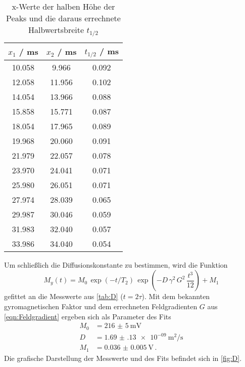 \begin{table}
  \centering
  \caption{x-Werte der halben Höhe der Peaks und die daraus errechnete
  Halbwertsbreite $t_{1/2}$}
  \label{tab:halbwertsbreite}
  \begin{tabular}{c c c}
    \toprule
    $x_1$ / \si{\ms} & $x_2$ / \si{\ms} & $t_{1/2}$ / \si{\ms} \\
    \midrule
    10.058 & 9.966 & 0.092 \\
    12.058 & 11.956 & 0.102 \\
    14.054 & 13.966 & 0.088 \\
    15.858 & 15.771 & 0.087 \\
    18.054 & 17.965 & 0.089 \\
    19.968 & 20.060 & 0.091 \\
    21.979 & 22.057 & 0.078 \\
    23.970 & 24.041 & 0.071 \\
    25.980 & 26.051 & 0.071 \\
    27.974 & 28.039 & 0.065 \\
    29.987 & 30.046 & 0.059 \\
    31.983 & 32.040 & 0.057 \\
    33.986 & 34.040 & 0.054 \\
    \bottomrule
  \end{tabular}
\end{table}

Um schließlich die Diffusionskonstante zu bestimmen, wird die Funktion
\begin{equation}
  M_y(t) = M_0 \, \exp(-t/T_2) \, \exp(-D \, \gamma^2 \, G^2 \, \frac{t^3}{12})
  + M_1
  \label{eqn:Diffusionskonstante}
\end{equation}
gefittet an die Messwerte aus \autoref{tab:D} ($t = 2\tau$). Mit dem bekannten
gyromagnetischen Faktor und dem errechneten Feldgradienten $G$ aus
\eqref{eqn:Feldgradient} ergeben sich als Parameter des Fits
\begin{align}
  M_0 &= \SI{216(5)}{\mV} \label{eqn:M0_D} \\
  D &= \SI{1.69(13)e-09}{\meter\squared\per\second} \label{eqn:diffusionskonstante} \\
  M_1 &= \SI{0.036(5)}{\V} \, .
\end{align}
Die grafische Darstellung der Messwerte und des Fits befindet sich in
\autoref{fig:D}.


